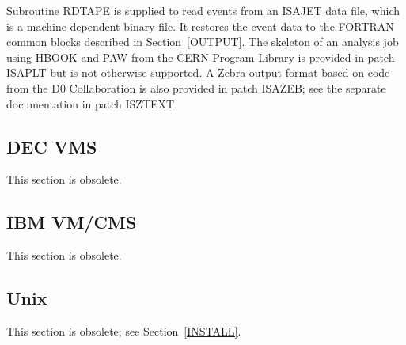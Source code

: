       Subroutine RDTAPE is supplied to read events from an ISAJET data
file, which is a machine-dependent binary file. It restores the event
data to the FORTRAN common blocks described in Section~\ref{OUTPUT}.
The skeleton of an analysis job using HBOOK and PAW from the CERN
Program Library is provided in patch ISAPLT but is not otherwise
supported. A Zebra output format based on code from the D0
Collaboration is also provided in patch ISAZEB; see the separate
documentation in patch ISZTEXT.

\subsection{DEC VMS}

This section is obsolete.

\subsection{IBM VM/CMS}

This section is obsolete.

\subsection{Unix}

This section is obsolete; see Section~\ref{INSTALL}.
